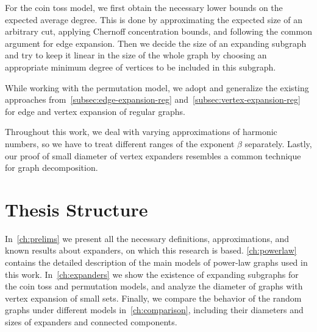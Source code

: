 For the coin toss model, we first obtain the necessary lower bounds
on the expected average degree. This is done by approximating
the expected size of an arbitrary cut, applying Chernoff concentration bounds,
and following the common argument for edge expansion.
Then we decide the size of an expanding subgraph and try to keep it linear
in the size of the whole graph by choosing an appropriate minimum degree
of vertices to be included in this subgraph.

While working with the permutation model, we adopt and generalize
the existing approaches from~\autoref{subsec:edge-expansion-reg}
and~\ref{subsec:vertex-expansion-reg}
for edge and vertex expansion of regular graphs.

Throughout this work, we deal with varying approximations of harmonic numbers,
so we have to treat different ranges of the exponent $\beta$ separately.
Lastly, our proof of small diameter of vertex expanders resembles
a common technique for graph decomposition.

\section{Thesis Structure}

In~\autoref{ch:prelims} we present all the necessary definitions,
approximations, and known results about expanders,
on which this research is based.
\autoref{ch:powerlaw} contains the detailed description
of the main models of power-law graphs used in this work.
In~\autoref{ch:expanders} we show the existence of expanding subgraphs
for the coin toss and permutation models,
and analyze the diameter of graphs with vertex expansion of small sets.
Finally, we compare the behavior of the random graphs
under different models in~\autoref{ch:comparison}, including their
diameters and sizes of expanders and connected components.
